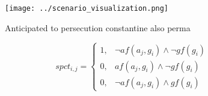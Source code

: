 \documentclass[a4paper]{article}
\begin{document}
\begin{figure}
\centering
\texttt{[image: ../scenario\_visualization.png]}
\caption{Anticipated to persecution constantine also perma
}
\end{figure}
 
\begin{equation}
spct_{i,j} =
\begin{cases}
1, & \text{$\neg af(a_j,g_i) \wedge \neg gf(g_i)$}\\
0, & \text{$af(a_j,g_i) \wedge \neg gf(g_i)$}\\
0, & \text{$\neg af(a_j,g_i) \wedge gf(g_i)$}
\end{cases}
\end{equation}
\end{document}
